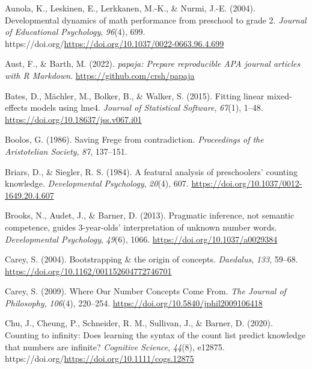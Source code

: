 \documentclass[
  man,floatsintext]{apa7}
\newlength{\cslhangindent}
\newenvironment{CSLReferences}[2] %
 {\begin{list}{}{%
  \setlength{\itemindent}{0pt}
  \setlength{\leftmargin}{0pt}
  \setlength{\parsep}{0pt}
  \ifodd #1
   \setlength{\leftmargin}{\cslhangindent}
   \setlength{\itemindent}{-1\cslhangindent}
  \fi
  \setlength{\itemsep}{#2\baselineskip}}}
 {\end{list}}
\begin{document}
\label{refs}
\begin{CSLReferences}{1}{0}
Aunola, K., Leskinen, E., Lerkkanen, M.-K., \& Nurmi, J.-E. (2004). Developmental dynamics of math performance from preschool to grade 2. \emph{Journal of Educational Psychology}, \emph{96}(4), 699. https://doi.org/\url{https://doi.org/10.1037/0022-0663.96.4.699}

Aust, F., \& Barth, M. (2022). \emph{{papaja}: {Prepare} reproducible {APA} journal articles with {R Markdown}}. \url{https://github.com/crsh/papaja}

Bates, D., Mächler, M., Bolker, B., \& Walker, S. (2015). Fitting linear mixed-effects models using {lme4}. \emph{Journal of Statistical Software}, \emph{67}(1), 1--48. \url{https://doi.org/10.18637/jss.v067.i01}

Boolos, G. (1986). Saving {Frege} from contradiction. \emph{Proceedings of the Aristotelian Society}, \emph{87}, 137--151.

Briars, D., \& Siegler, R. S. (1984). A featural analysis of preschoolers' counting knowledge. \emph{Developmental Psychology}, \emph{20}(4), 607. \url{https://doi.org/10.1037/0012-1649.20.4.607}

Brooks, N., Audet, J., \& Barner, D. (2013). Pragmatic inference, not semantic competence, guides 3-year-olds' interpretation of unknown number words. \emph{Developmental Psychology}, \emph{49}(6), 1066. \url{https://doi.org/10.1037/a0029384}

Carey, S. (2004). Bootstrapping \& the origin of concepts. \emph{Daedalus}, \emph{133}, 59--68. \url{https://doi.org/10.1162/001152604772746701}

Carey, S. (2009). Where {Our} {Number} {Concepts} {Come} {From}. \emph{The Journal of Philosophy}, \emph{106}(4), 220--254. \url{https://doi.org/10.5840/jphil2009106418}

Chu, J., Cheung, P., Schneider, R. M., Sullivan, J., \& Barner, D. (2020). Counting to infinity: Does learning the syntax of the count list predict knowledge that numbers are infinite? \emph{Cognitive Science}, \emph{44}(8), e12875. https://doi.org/\href{\%20https://doi.org/10.1111/cogs.12875}{https://doi.org/10.1111/cogs.12875}


\end{CSLReferences}
\end{document}
